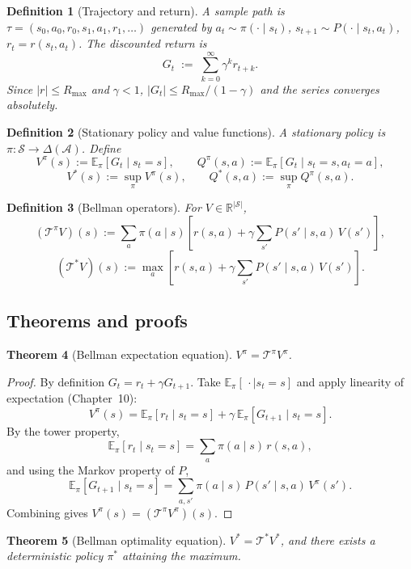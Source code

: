 \documentclass[11pt]{article}
\newtheorem{theorem}{Theorem}[section]
\newtheorem{definition}[theorem]{Definition}
\theoremstyle{remark}
\begin{document}
\begin{definition}[Trajectory and return]
A sample path is $\tau = (s_0, a_0, r_0, s_1, a_1, r_1, \dots)$ generated by $a_t \sim \pi(\cdot\mid s_t)$, $s_{t+1}\sim P(\cdot\mid s_t, a_t)$, $r_t = r(s_t, a_t)$. The \emph{discounted return} is
\[
G_t \;:=\; \sum_{k=0}^{\infty}\gamma^k r_{t+k}.
\]
Since $|r|\le R_{\max}$ and $\gamma<1$, $|G_t|\le R_{\max}/(1-\gamma)$ and the series converges absolutely.
\end{definition}

\begin{definition}[Stationary policy and value functions]
A stationary policy is $\pi : \mathcal{S}\to\Delta(\mathcal{A})$. Define
\[
V^\pi(s) := \mathbb{E}_\pi[G_t\mid s_t=s], \qquad
Q^\pi(s,a) := \mathbb{E}_\pi[G_t\mid s_t=s, a_t=a],
\]
\[
V^*(s) := \sup_\pi V^\pi(s), \qquad Q^*(s,a) := \sup_\pi Q^\pi(s,a).
\]
\end{definition}

\begin{definition}[Bellman operators]
For $V \in \mathbb{R}^{|\mathcal{S}|}$,
\[
(\mathcal{T}^\pi V)(s) := \sum_a \pi(a\mid s)\!\left[r(s,a) + \gamma \sum_{s'} P(s'\mid s,a)\, V(s')\right],
\]
\[
(\mathcal{T}^* V)(s) := \max_a\!\left[r(s,a) + \gamma \sum_{s'} P(s'\mid s,a)\, V(s')\right].
\]
\end{definition}

\subsection*{Theorems and proofs}

\begin{theorem}[Bellman expectation equation]
$V^\pi = \mathcal{T}^\pi V^\pi$.
\end{theorem}

\begin{proof}
By definition $G_t = r_t + \gamma G_{t+1}$. Take $\mathbb{E}_\pi[\,\cdot\mid s_t = s]$ and apply linearity of expectation (Chapter~10):
\[
V^\pi(s) = \mathbb{E}_\pi[r_t \mid s_t=s] + \gamma \,\mathbb{E}_\pi[G_{t+1}\mid s_t=s].
\]
By the tower property,
\[
\mathbb{E}_\pi[r_t\mid s_t=s] = \sum_a \pi(a\mid s)\, r(s,a),
\]
and using the Markov property of $P$,
\[
\mathbb{E}_\pi[G_{t+1}\mid s_t=s] = \sum_{a,s'} \pi(a\mid s)\, P(s'\mid s,a)\, V^\pi(s').
\]
Combining gives $V^\pi(s) = (\mathcal{T}^\pi V^\pi)(s)$.
\end{proof}

\begin{theorem}[Bellman optimality equation]
$V^* = \mathcal{T}^* V^*$, and there exists a deterministic policy $\pi^*$ attaining the maximum.
\end{theorem}
\end{document}
